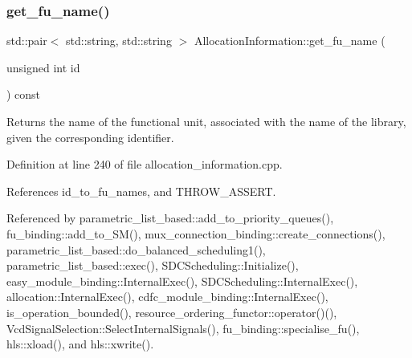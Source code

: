 \subsubsection{\texorpdfstring{get\+\_\+fu\+\_\+name()}{get\_fu\_name()}}
{\footnotesize\ttfamily std\+::pair$<$ std\+::string, std\+::string $>$ Allocation\+Information\+::get\+\_\+fu\+\_\+name (\begin{DoxyParamCaption}\item[{unsigned int}]{id }\end{DoxyParamCaption}) const}



Returns the name of the functional unit, associated with the name of the library, given the corresponding identifier. 



Definition at line 240 of file allocation\+\_\+information.\+cpp.



References id\+\_\+to\+\_\+fu\+\_\+names, and T\+H\+R\+O\+W\+\_\+\+A\+S\+S\+E\+RT.



Referenced by parametric\+\_\+list\+\_\+based\+::add\+\_\+to\+\_\+priority\+\_\+queues(), fu\+\_\+binding\+::add\+\_\+to\+\_\+\+S\+M(), mux\+\_\+connection\+\_\+binding\+::create\+\_\+connections(), parametric\+\_\+list\+\_\+based\+::do\+\_\+balanced\+\_\+scheduling1(), parametric\+\_\+list\+\_\+based\+::exec(), S\+D\+C\+Scheduling\+::\+Initialize(), easy\+\_\+module\+\_\+binding\+::\+Internal\+Exec(), S\+D\+C\+Scheduling\+::\+Internal\+Exec(), allocation\+::\+Internal\+Exec(), cdfc\+\_\+module\+\_\+binding\+::\+Internal\+Exec(), is\+\_\+operation\+\_\+bounded(), resource\+\_\+ordering\+\_\+functor\+::operator()(), Vcd\+Signal\+Selection\+::\+Select\+Internal\+Signals(), fu\+\_\+binding\+::specialise\+\_\+fu(), hls\+::xload(), and hls\+::xwrite().

